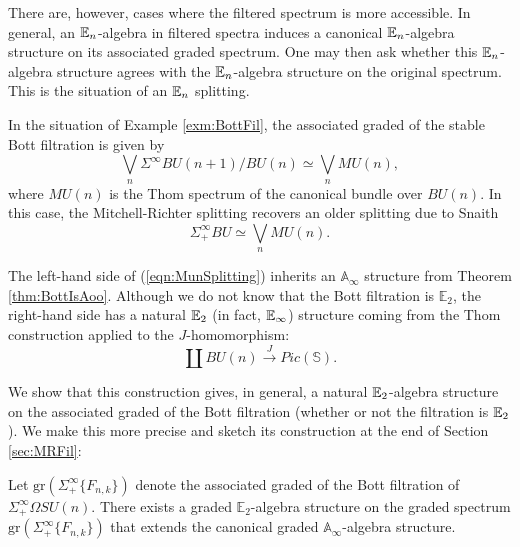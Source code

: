 There are, however, cases where the filtered spectrum is more accessible.  In general, an $\operatorname{\mathbb{E}}_n$-algebra in filtered spectra induces a canonical $\operatorname{\mathbb{E}}_n$-algebra structure on its associated graded spectrum.  One may then ask whether this $\operatorname{\mathbb{E}}_n$-algebra structure agrees with the $\operatorname{\mathbb{E}}_n$-algebra structure on the original spectrum.  This is the situation of an $\operatorname{\mathbb{E}}_n$ splitting.  

\begin{exm}
In the situation of Example \ref{exm:BottFil}, the associated graded of the stable Bott filtration is given by
\begin{equation}\label{eqn:MunSplitting}
\bigvee_n \Sigma^{\infty} BU(n+1)/BU(n) \simeq \bigvee_n MU(n),
\end{equation}
where $MU(n)$ is the Thom spectrum of the canonical bundle over $BU(n)$.  In this case, the Mitchell-Richter splitting recovers an older splitting due to Snaith \cite{SnaithBook}
$$\Sigma^{\infty}_+ BU \simeq \bigvee_n MU(n).$$ %

The left-hand side of (\ref{eqn:MunSplitting}) inherits an $\mathbb{A}_\infty$ structure from Theorem \ref{thm:BottIsAoo}.  Although we do not know that the Bott filtration is $\mathbb{E}_2$, the right-hand side has a natural $\operatorname{\mathbb{E}}_2$ (in fact, $\operatorname{\mathbb{E}}_\infty$) structure coming from the Thom construction applied to the $J$-homomorphism:
$$\coprod BU(n) \stackrel{J}{\longrightarrow} Pic(\mathbb{S}).$$
\end{exm}

We show that this construction gives, in general, a natural $\operatorname{\mathbb{E}}_2$-algebra structure on the associated graded of the Bott filtration (whether or not the filtration is $\operatorname{\mathbb{E}}_2$).  We make this more precise and sketch its construction at the end of Section \ref{sec:MRFil}:

\begin{cnstr} \label{cnstr:IntroGr}
Let $\text{gr}(\Sigma^{\infty}_+\{F_{n,k}\})$ denote the associated graded of the Bott filtration of $\Sigma^{\infty}_+ \Omega SU(n)$.  There exists a graded $\mathbb{E}_2$-algebra structure on the graded spectrum $\text{gr}(\Sigma^{\infty}_+ \{F_{n,k}\})$ that extends the canonical graded $\mathbb{A}_\infty$-algebra structure.
\end{cnstr}


